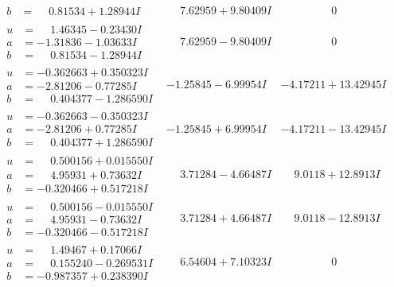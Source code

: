 \documentclass[1p]{elsarticle_modified}
\theoremstyle{definition}
\begin{document}
$$\begin{array}{c|c|c}
\begin{aligned}
b &= \phantom{-}0.81534 + 1.28944 I\end{aligned}
 & \phantom{-}7.62959 + 9.80409 I & \phantom{-0.000000 } 0 \\ \hline\begin{aligned}
u &= \phantom{-}1.46345 - 0.23430 I \\
a &= -1.31836 - 1.03633 I \\
b &= \phantom{-}0.81534 - 1.28944 I\end{aligned}
 & \phantom{-}7.62959 - 9.80409 I & \phantom{-0.000000 } 0 \\ \hline\begin{aligned}
u &= -0.362663 + 0.350323 I \\
a &= -2.81206 - 0.77285 I \\
b &= \phantom{-}0.404377 - 1.286590 I\end{aligned}
 & -1.25845 - 6.99954 I & -4.17211 + 13.42945 I \\ \hline\begin{aligned}
u &= -0.362663 - 0.350323 I \\
a &= -2.81206 + 0.77285 I \\
b &= \phantom{-}0.404377 + 1.286590 I\end{aligned}
 & -1.25845 + 6.99954 I & -4.17211 - 13.42945 I \\ \hline\begin{aligned}
u &= \phantom{-}0.500156 + 0.015550 I \\
a &= \phantom{-}4.95931 + 0.73632 I \\
b &= -0.320466 + 0.517218 I\end{aligned}
 & \phantom{-}3.71284 - 4.66487 I & \phantom{-}9.0118 + 12.8913 I \\ \hline\begin{aligned}
u &= \phantom{-}0.500156 - 0.015550 I \\
a &= \phantom{-}4.95931 - 0.73632 I \\
b &= -0.320466 - 0.517218 I\end{aligned}
 & \phantom{-}3.71284 + 4.66487 I & \phantom{-}9.0118 - 12.8913 I \\ \hline\begin{aligned}
u &= \phantom{-}1.49467 + 0.17066 I \\
a &= \phantom{-}0.155240 - 0.269531 I \\
b &= -0.987357 + 0.238390 I\end{aligned}
 & \phantom{-}6.54604 + 7.10323 I & \phantom{-0.000000 } 0 \\ \hline\begin{aligned}

\end{aligned}
\end{array}$$
\end{document}
